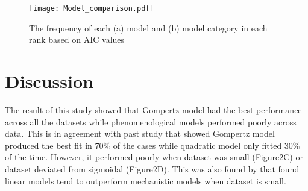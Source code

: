 \documentclass[11pt, a4paper]{article}
\begin{document}
\begin{figure}[H]
\texttt{[image: Model\_comparison.pdf]}
\caption{The frequency of each (a) model and (b) model category in each rank based on AIC values} 
\end{figure}

\section{Discussion}
The result of this study showed that Gompertz model had the best performance across all the datasets while phenomenological models performed poorly across data. This is in agreement with past study \citep{Zwietering1990} that showed Gompertz model produced the best fit in 70\% of the cases while quadratic model only fitted 30\% of the time. However, it performed poorly when dataset was small (Figure2C) or dataset deviated from sigmoidal (Figure2D). This was also found by \cite{Buchanan1997} that found linear models tend to outperform mechanistic models when dataset is small.  





\end{document}
